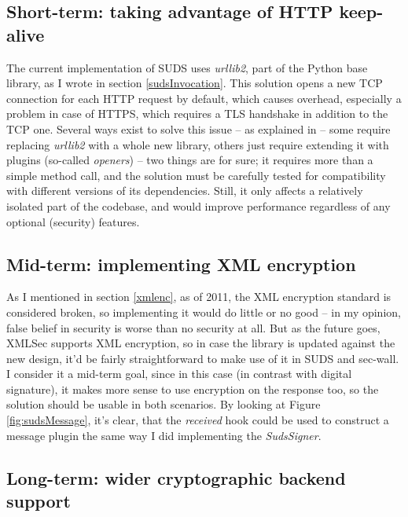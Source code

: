 \subsection{Short-term: taking advantage of HTTP keep-alive}

The current implementation of SUDS uses \emph{urllib2}, part of the Python base library, as I wrote in section \ref{sudsInvocation}. This solution opens a new TCP connection for each HTTP request by default, which causes overhead, especially a problem in case of HTTPS, which requires a TLS handshake in addition to the TCP one. Several ways exist to solve this issue -- as explained in \cite{so-1037406} -- some require replacing \emph{urllib2} with a whole new library, others just require extending it with plugins (so-called \emph{openers}) -- two things are for sure; it requires more than a simple method call, and the solution must be carefully tested for compatibility with different versions of its dependencies. Still, it only affects a relatively isolated part of the codebase, and would improve performance regardless of any optional (security) features.

\subsection{Mid-term: implementing XML encryption}

As I mentioned in section \ref{xmlenc}, as of 2011, the XML encryption standard is considered broken, so implementing it would do little or no good -- in my opinion, false belief in security is worse than no security at all. But as the future goes, XMLSec supports XML encryption, so in case the library is updated against the new design, it'd be fairly straightforward to make use of it in SUDS and sec-wall. I consider it a mid-term goal, since in this case (in contrast with digital signature), it makes more sense to use encryption on the response too, so the solution should be usable in both scenarios. By looking at Figure \ref{fig:sudsMessage}, it's clear, that the \emph{received} hook could be used to construct a message plugin the same way I did implementing the \emph{SudsSigner}.

\subsection{Long-term: wider cryptographic backend support}

